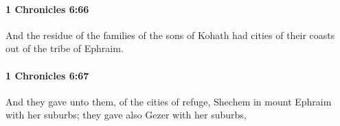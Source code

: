 		\paragraph{1 Chronicles 6:66} %
			\label{1CHRONICLES-6-66}

			And the residue of the families of the sons of Kohath had cities of their coasts out of the tribe of Ephraim.


		\paragraph{1 Chronicles 6:67} %
			\label{1CHRONICLES-6-67}

			And they gave unto them, of the cities of refuge, Shechem in mount Ephraim with her suburbs; they gave also Gezer with her suburbs,


